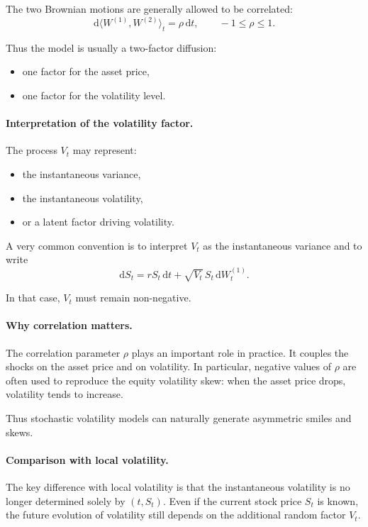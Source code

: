 \documentclass[11pt]{article}
\theoremstyle{plain}
\theoremstyle{definition}
\theoremstyle{remark}
\begin{document}
The two Brownian motions are generally allowed to be correlated:
\[
\mathrm{d}\langle W^{(1)},W^{(2)}\rangle_t=\rho\,\mathrm{d}t,
\qquad -1\le \rho \le 1.
\]

Thus the model is usually a two-factor diffusion:
\begin{itemize}[leftmargin=1.4em]
    \item one factor for the asset price,
    \item one factor for the volatility level.
\end{itemize}

\paragraph{Interpretation of the volatility factor.}
The process \(V_t\) may represent:
\begin{itemize}[leftmargin=1.4em]
    \item the instantaneous variance,
    \item the instantaneous volatility,
    \item or a latent factor driving volatility.
\end{itemize}

A very common convention is to interpret \(V_t\) as the instantaneous
variance and to write
\[
\mathrm{d}S_t
=
rS_t\,\mathrm{d}t
+
\sqrt{V_t}\,S_t\,\mathrm{d}W_t^{(1)}.
\]

In that case, \(V_t\) must remain non-negative.

\paragraph{Why correlation matters.}
The correlation parameter \(\rho\) plays an important role in practice.
It couples the shocks on the asset price and on volatility.
In particular, negative values of \(\rho\) are often used to reproduce
the equity volatility skew:
when the asset price drops, volatility tends to increase.

Thus stochastic volatility models can naturally generate asymmetric
smiles and skews.

\paragraph{Comparison with local volatility.}
The key difference with local volatility is that the instantaneous
volatility is no longer determined solely by \((t,S_t)\).
Even if the current stock price \(S_t\) is known, the future evolution
of volatility still depends on the additional random factor \(V_t\).
\end{document}
